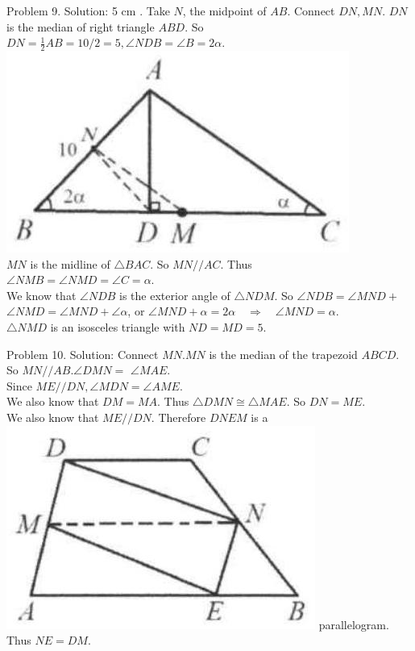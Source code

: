 \documentclass[10pt]{article}
\begin{document}
Problem 9. Solution: 5 cm .
Take \(N\), the midpoint of \(A B\). Connect \(D N, M N\). \(D N\) is the median of right triangle \(A B D\). So \(D N=\frac{1}{2} A B=10 / 2=5, \angle N D B=\angle B=2 \alpha\).\\
\includegraphics[max width=\textwidth, center]{2025_04_17_97bc1f7e44d93c271a88g-051(1)}\\
\(M N\) is the midline of \(\triangle B A C\). So \(M N / / A C\). Thus\\
\(\angle N M B=\angle N M D=\angle C=\alpha\).\\
We know that \(\angle N D B\) is the exterior angle of \(\triangle N D M\). So \(\angle N D B=\angle M N D+\) \(\angle N M D=\angle M N D+\angle \alpha\), or \(\angle M N D+\alpha=2 \alpha \quad \Rightarrow \quad \angle M N D=\alpha\).\\
\(\triangle N M D\) is an isosceles triangle with \(N D=M D=5\).

Problem 10. Solution:
Connect \(M N . M N\) is the median of the trapezoid \(A B C D\). So \(M N / / A B . \angle D M N=\) \(\angle M A E\).\\
Since \(M E / / D N, \angle M D N=\angle A M E\).\\
We also know that \(D M=M A\). Thus \(\triangle D M N \cong \triangle M A E\). So \(D N=M E\).\\
We also know that \(M E / / D N\). Therefore \(D N E M\) is a\\
\includegraphics[max width=\textwidth]{2025_04_17_97bc1f7e44d93c271a88g-051} parallelogram. Thus \(N E=D M\).
\end{document}
